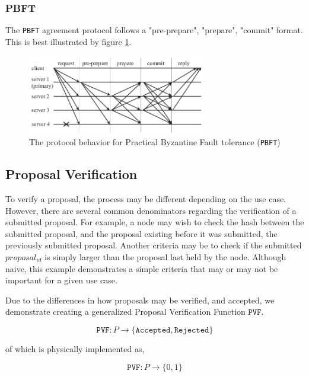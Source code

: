\documentclass[10pt, titlepage, twocolumn]{report}
\begin{document}
\subsubsection{PBFT}
\hspace*{15pt}
The \texttt{PBFT} agreement protocol follows a "pre-prepare", "prepare", "commit" format. This is best illustrated by figure \ref{PBFT}.

\begin{figure}[ht]
\centering
	\includegraphics[width=0.7\textwidth]{PBFT}
	\caption{The protocol behavior for Practical Byzantine Fault tolerance (\texttt{PBFT})}
	\label{PBFT}
\end{figure}


\subsection{Proposal Verification}
\hspace*{15pt}
To verify a proposal, the process may be different depending on the use case. However, there are several common denominators regarding the verification of a submitted proposal. For example, a node may wish to check the hash between the submitted proposal, and the proposal existing before it was submitted, the previously submitted proposal. Another criteria may be to check if the submitted \(proposal_{id}\) is simply larger than the proposal last held by the node. Although naive, this example demonstrates a simple criteria that may or may not be important for a given use case.

Due to the differences in how proposals may be verified, and accepted, we demonstrate creating a generalized Proposal Verification Function \(\texttt{PVF}\). 

\begin{equation}
\texttt{PVF} : P \rightarrow \{\texttt{Accepted}, \texttt{Rejected}\}
\end{equation}

of which is physically implemented as,

\begin{equation}
\texttt{PVF} : P \rightarrow \{0, 1\}
\end{equation}
\end{document}

